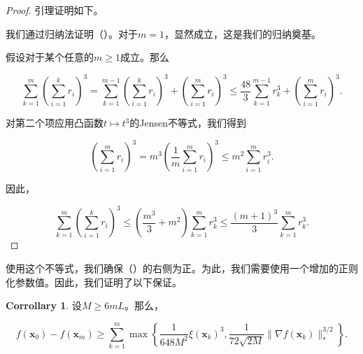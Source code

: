 \documentclass[a4paper,twoside,AutoFakeBold]{article}
\theoremstyle{definition}
\newtheorem{corr2}{{Corrollary}}[section]
\begin{document}
\begin{proof}
引理证明如下。

我们通过归纳法证明（）。对于\(m = 1\)，显然成立，这是我们的归纳奠基。

假设对于某个任意的\(m \geq 1\)成立。那么

\begin{equation}\label{B.49}
\sum_{k=1}^{m} \left( \sum_{i=1}^{k} r_i \right)^3 = 
\sum_{k=1}^{m-1} \left( \sum_{i=1}^{k} r_i \right)^3 + 
\left( \sum_{i=1}^{m} r_i \right)^3 \leq \frac{48}{3} 
\sum_{k=1}^{m-1} r_k^3 + \left( \sum_{i=1}^{m} r_i \right)^3. \tag{B.49}
\end{equation}

对第二个项应用凸函数\(t \mapsto t^3\)的Jensen不等式，我们得到

\begin{equation}\label{B.50}
\left( \sum_{i=1}^{m} r_i \right)^3 = m^3 \left( \frac{1}{m} 
\sum_{i=1}^{m} r_i \right)^3 \leq m^2 \sum_{i=1}^{m} r_i^3. \tag{B.50}
\end{equation}

因此，

\[
\sum_{k=1}^{m} \left( \sum_{i=1}^{k} r_i \right)^3 \leq 
\left( \frac{m^3}{3} + m^2 \right) \sum_{k=1}^{m} r_k^3 
\leq \frac{(m+1)^3}{3} \sum_{k=1}^{m} r_k^3. 
\]
\end{proof}
使用这个不等式，我们确保（）的右侧为正。为此，我们需要使用一个增加的正则化参数值。因此，我们证明了以下保证。

\begin{corr2}\label{corr:B.2}
设\(M \geq 6mL\)。那么，

\begin{equation}\label{B.51}
f(\mathbf{x}_0) - f(\mathbf{x}_m) \geq \sum_{k=1}^{m} 
\max \left\{ \frac{1}{648M^2} \xi(\mathbf{x}_k)^3, \frac{1}{72\sqrt{2M}} 
\|\nabla f(\mathbf{x}_k)\|_*^{3/2} \right\}. \tag{B.51}
\end{equation}

\end{corr2}
\end{document}
